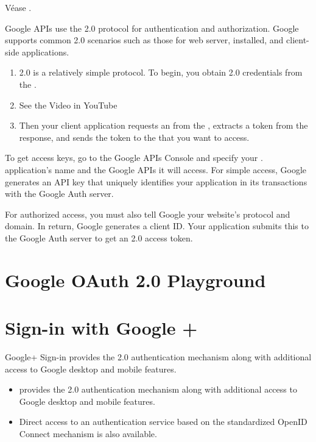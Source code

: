 Véase 
.

Google APIs use the \OAuth{} 2.0 protocol for authentication and
authorization. Google supports common \OAuth{} 2.0 scenarios such as those
for web server, installed, and client-side applications.

\begin{enumerate}
\item
\OAuth{} 2.0 is a relatively simple protocol. To begin, you obtain \OAuth{}
2.0 credentials from the 
. 
\item
See the Video in YouTube 
\item
Then your client
application requests an  from the 
,
extracts a token from the response, and sends the token to the 
that you want to access.
\end{enumerate}

To get access keys, go to the Google APIs Console and specify your
. 
application's name and the Google APIs it will access. For simple access,
Google generates an API key that uniquely identifies your application
in its transactions with the Google Auth server.

For authorized access, you must also tell Google your website's protocol
and domain. In return, Google generates a client ID. Your application
submits this to the Google Auth server to get an \OAuth{} 2.0 access
token.

\section{Google OAuth 2.0 Playground}

\section{Sign-in with Google +} 
Google+ Sign-in provides the \OAuth{} 2.0 authentication mechanism along
with additional access to Google desktop and mobile features.
\begin{itemize}
\item
{}
provides the \OAuth{} 2.0 authentication mechanism along with additional access to Google desktop and mobile features.
\item
Direct access to an authentication service based on the standardized OpenID Connect mechanism is also available.
\end{itemize}

